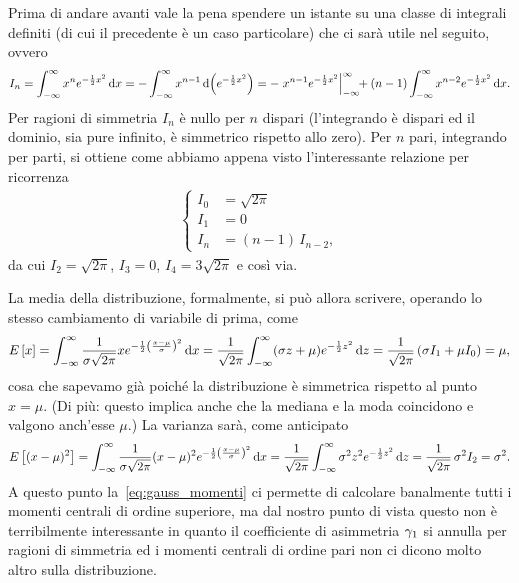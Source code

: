 Prima di andare avanti vale la pena spendere un istante su una classe di
integrali definiti (di cui il precedente è un caso particolare) che ci sarà
utile nel seguito, ovvero
\begin{align*}
  I_n = \int_{-\infty}^\infty x^n e^{-\frac{1}{2}x^2} \diff[x] =
  - \int_{-\infty}^\infty x^{n-1} \diff[\left(e^{-\frac{1}{2}x^2}\right)] =
  - \eval{x^{n-1} e^{-\frac{1}{2}x^2}}{-\infty}{\infty}\;\;\;\; +
  (n - 1) \int_{-\infty}^\infty x^{n-2} e^{-\frac{1}{2}x^2} \diff[x].
\end{align*}
Per ragioni di simmetria $I_n$ è nullo per $n$ dispari (l'integrando è
dispari ed il dominio, sia pure infinito, è simmetrico rispetto allo zero).
Per $n$ pari, integrando per parti, si ottiene come abbiamo appena visto
l'interessante relazione per ricorrenza
\begin{align}\label{eq:gauss_momenti}
  \begin{cases}
    I_0 & = \sqrt{2\pi}\\
    I_1 & = 0\\
    I_n & = (n - 1)\, I_{n - 2},
  \end{cases}
\end{align}
da cui $I_2 = \sqrt{2\pi}$, $I_3 = 0$, $I_4 = 3\sqrt{2\pi}$ e così via.

La media della distribuzione, formalmente, si può allora scrivere, operando
lo stesso cambiamento di variabile di prima, come
\begin{align*}
  \expect{x} = \int_{-\infty}^\infty \frac{1}{\sigma\sqrt{2\pi}}
  x e^{-\frac{1}{2}\left(\frac{x-\mu}{\sigma}\right)^2} \diff =
  \frac{1}{\sqrt{2\pi}}\int_{-\infty}^\infty
  (\sigma z + \mu) e^{-\frac{1}{2}z^2} \diff[z] =
  \frac{1}{\sqrt{2\pi}} \, (\sigma I_1 + \mu I_0) = \mu,
\end{align*}
cosa che sapevamo già poiché la distribuzione è simmetrica rispetto al
punto $x = \mu$. (Di più: questo implica anche che la mediana e la moda
coincidono e valgono anch'esse $\mu$.) La varianza sarà, come anticipato
\begin{align*}
  \expect{(x - \mu)^2} = \int_{-\infty}^\infty \frac{1}{\sigma\sqrt{2\pi}}
  (x - \mu)^2 e^{-\frac{1}{2}\left(\frac{x-\mu}{\sigma}\right)^2} \diff =
  \frac{1}{\sqrt{2\pi}}\int_{-\infty}^\infty \sigma^2z^2e^{-\frac{1}{2}z^2} \diff[z] =
  \frac{1}{\sqrt{2\pi}} \, \sigma^2 I_2 = \sigma^2.
\end{align*}
A questo punto la~\eqref{eq:gauss_momenti} ci permette di calcolare banalmente
tutti i momenti centrali di ordine superiore, ma dal nostro punto di vista
questo non è terribilmente interessante in quanto il coefficiente di
asimmetria $\skewness$ si annulla per ragioni di simmetria ed i momenti
centrali di ordine pari non ci dicono molto altro sulla distribuzione.

